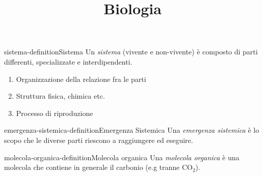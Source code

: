 \documentclass[preview]{standalone}
\begin{document}
\title{Biologia}
\genpage

\begin{snippetdefinition}{sistema-definition}{Sistema}
    Un \textit{sistema} (vivente e non-vivente) è composto di parti differenti, specializzate e interdipendenti. 
    
    \begin{enumerate}
        \item Organizzazione della relazione fra le parti
        \item Struttura fisica, chimica etc. 
        \item Processo di riproduzione
    \end{enumerate}
\end{snippetdefinition}

\begin{snippetdefinition}{emergenza-sistemica-definition}{Emergenza Sistemica}
    Una \textit{emergenza sistemica} è lo scopo che le diverse parti riescono a raggiungere ed eseguire.
\end{snippetdefinition}


\begin{snippetdefinition}{molecola-organica-definition}{Molecola organica}
    Una \textit{molecola organica} è una molecola che contiene in generale il carbonio (e.g tranne CO\({}_2\)).
\end{snippetdefinition}
\end{document}
